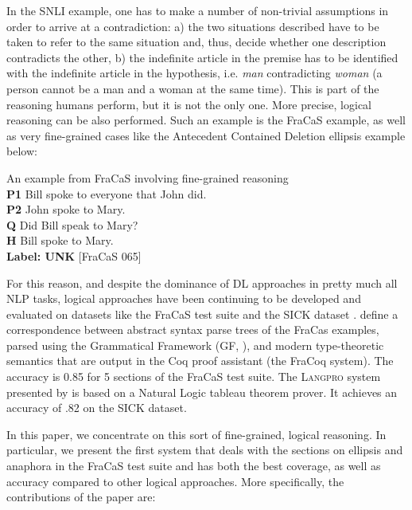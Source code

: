 \documentclass{article}
\begin{document}
In the SNLI example, one has to make a number of non-trivial assumptions in order to arrive at a contradiction:  a)  the two situations described have to be taken to refer to  the same situation and, thus, decide  whether one description contradicts the other, b) the indefinite article in the premise has to be identified with the indefinite article in the hypothesis, i.e.  \textit{man} contradicting \textit{woman} (a person cannot be a man and a woman at the same time). This is part of the reasoning humans perform, but it is not the only one. More precise, logical reasoning can be also performed. Such an example is the FraCaS example, as well as very fine-grained cases like the Antecedent Contained Deletion  ellipsis example below:


\begin{lingex}

\item An example from FraCaS involving fine-grained reasoning\\
\textbf{P1}	Bill spoke to everyone that John did.	\\	
\textbf{P2}	John spoke to Mary.	\\
\textbf{Q} 	Did Bill speak to Mary?\\
\textbf{H} 	Bill spoke to Mary.\\
\textbf{Label:	UNK} [FraCaS 065] 	\end{lingex}




For this reason, and despite the dominance of DL approaches in pretty much all NLP tasks, logical approaches have been continuing to be developed and evaluated on datasets like the FraCaS test suite and the SICK dataset \cite{marelli:2014}.  \citet{bernardy:2017}  define  a correspondence between abstract syntax parse trees of the FraCas examples, parsed using the Grammatical Framework (GF, \citet{Ranta:GF}), and modern type-theoretic semantics that are output in the Coq proof assistant (the FraCoq system).  The accuracy is 0.85 for 5 sections of the FraCaS test suite. The \textsc{Langpro} system presented by \citet{abzianidze:2017} is based on a Natural Logic tableau theorem prover. It achieves an accuracy of .82 on the SICK dataset. 

In this paper, we concentrate on this sort of fine-grained, logical reasoning. In particular, we present the first system that deals with the sections on ellipsis and anaphora in the FraCaS test suite and has both the best coverage, as well as accuracy compared to other logical approaches. More specifically, the contributions of the paper are:
\end{document}
